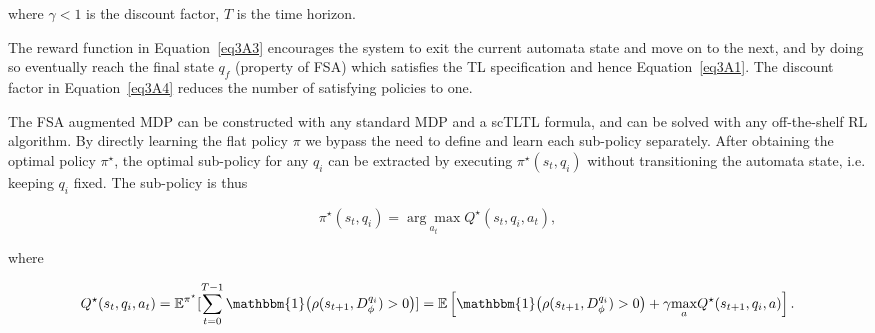 \documentclass{article}
\begin{document}
\noindent where $\gamma < 1$ is the discount factor, $T$ is the time horizon.



The reward function in Equation~\eqref{eq3A3} encourages the system to exit the current automata state and move on to the next, and by doing so eventually reach the final state $q_f$ (property of FSA) which satisfies the TL specification and hence Equation~\eqref{eq3A1}. The discount factor in Equation~\eqref{eq3A4} reduces the number of satisfying policies to one. 




The FSA augmented MDP can be constructed with any standard MDP and a scTLTL formula, and can be solved with any off-the-shelf RL algorithm. By directly learning the flat policy $\pi$ we bypass the need to define and learn each sub-policy separately. After obtaining the optimal policy $\pi^\star$, the optimal sub-policy for any $q_i$ can be extracted by executing $\pi^\star(s_t,q_i)$ without transitioning the automata state, i.e. keeping $q_i$ fixed. The sub-policy is thus

\begin{equation}\label{eq3A5}
\pi^\star(s_t,q_i) = \underset{a_t}{\arg\max}Q^\star(s_t, q_i, a_t), 
\end{equation}

\noindent where

\begin{equation}\label{eq3A6}
Q^\star(s_t, q_i, a_t) = \mathbb{E}^{\pi^\star}[\sum_{t=0}^{T-1}\mathbbm{1}\big(\rho(s_{t+1},D_{\phi}^{q_{i}})>0\big)]
= \mathbb{E}\left[\mathbbm{1}\big(\rho(s_{t+1},D_{\phi}^{q_{i}})>0\big) + \gamma \underset{a}{\max}Q^\star(s_{t+1}, q_i, a)\right]. 
\end{equation}
\end{document}

